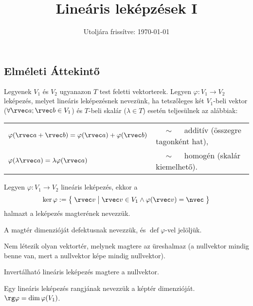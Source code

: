 \documentclass[a4paper, 12pt]{scrartcl}
\title{Lineáris leképzések I}
\date{Utoljára frissítve: \today}
\begin{document}
\maketitle
\subsection{Elméleti Áttekintő}

\begin{definition}
  Legyenek $V_1$ és $V_2$ ugyanazon $T$ test feletti vektorterek. Legyen
  $\varphi: V_1 \rightarrow V_2$ leképezés, melyet lineáris leképezésnek
  nevezünk, ha tetszőleges két $V_1$-beli vektor ($\forall \rvec a; \rvec b \in
    V_1$) és $T$-beli skalár ($\lambda \in T$) esetén teljesülnek az alábbiak:

  \def\arraystretch{1.5}
  \begin{tabular}{>{\bullet\;}l>{$\quad \sim \quad$}l}
    $\varphi(\rvec a + \rvec b) = \varphi(\rvec a) + \varphi(\rvec b)$
     & additív (összegre tagonként hat), \\
    $\varphi(\lambda \rvec a) = \lambda \varphi(\rvec a)$
     & homogén (skalár kiemelhető).
  \end{tabular}
\end{definition}

\begin{definition}
  Legyen $\varphi: V_1 \rightarrow V_2$ lineáris leképezés, ekkor a
  $$
    \ker \varphi := \big\{\;
    \rvec v \; \big| \; \rvec v \in V_1 \land \varphi(\rvec v) = \nvec
    \;\big\}
  $$
  halmazt a leképezés magterének nevezzük.
\end{definition}

\begin{definition}
  A magtér dimenzióját defektusnak nevezzük, és $\operatorname{def} \varphi$-vel
  jelöljük.
\end{definition}

\begin{note}
  Nem létezik olyan vektortér, melynek magtere az üreshalmaz
  (a nullvektor mindig benne van, mert a nullvektor képe mindig nullvektor).
\end{note}

\begin{note}
  Invertálható lineáris leképezés magtere a nullvektor.
\end{note}

\begin{definition}
  Egy lineáris leképezés rangjának nevezzük a képtér dimenzióját.
  $\rg \varphi = \dim \varphi(V_1)$.
\end{definition}
\end{document}
